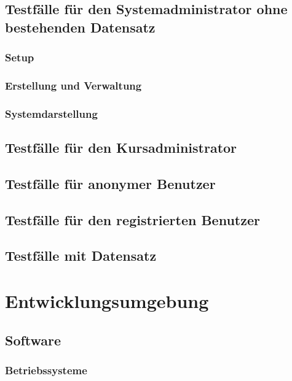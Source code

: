 \documentclass[a4paper]{scrreprt}
\begin{document}
	\section{Testfälle für den Systemadministrator ohne bestehenden Datensatz}
		\subsection{Setup}
				
		\subsection{Erstellung und Verwaltung}
			
			
		\subsection{Systemdarstellung}
			
			
			
		\section{Testfälle für den Kursadministrator}
		
			
	\section{Testfälle für anonymer Benutzer}
	
		
	\section{Testfälle für den registrierten Benutzer}
		

\section{Testfälle mit Datensatz}






\chapter{Entwicklungsumgebung}
    \section{Software}
        \subsection{Betriebssysteme}
            
\end{document}

